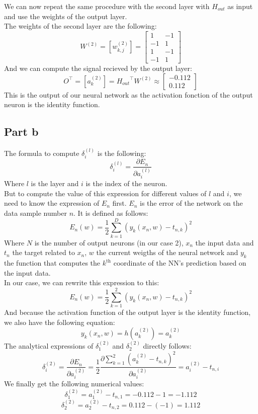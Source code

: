 \documentclass[a4paper, 10pt]{article}
\begin{document}
We can now repeat the same procedure with the second layer with $H_{out}$ as input and 
use the weights of the output layer.
\\
The weights of the second layer are the following:
$$
W^{(2)} = [w_{k,j}^{(2)}] = \begin{bmatrix}
    1 & -1\\
    -1 & 1\\
    1 & -1\\
    -1 & 1
\end{bmatrix}
$$
And we can compute the signal recieved by the output layer:
$$
O^\top = [a_k^{(2)}] = {H_{out}}^\top W^{(2)} \approx \begin{bmatrix}
    -0.112\\
    0.112
\end{bmatrix}
$$
This is the output of our neural network as the activation
fonction of the output neuron is the identity function.

\subsection{Part b}
The formula to compute $\delta_i^{(l)}$ is the following:
$$
\delta_i^{(l)} = \frac{\partial E_n}{\partial a_i^{(l)}}
$$
Where $l$ is the layer and $i$ is the index of the neuron.
\\
But to compute the value of this expression for different values of $l$ and $i$,
we need to know the expression of $E_n$ first. $E_n$ is the error of the network
on the data sample number $n$. It is defined as follows:
$$
E_n(w) = \frac{1}{2} \sum_{k=1}^D ( y_k(x_n,w)-t_{n,k})^2
$$
Where $N$ is the number of output neurons (in our case 2), $x_n$ the input data and 
$t_n$ the target related to $x_n$, $w$ the current weigths of the neural network and 
$y_k$ the function that computes the $k^\text{th}$ coordinate of the NN's prediction based on the input data.
\\
In our case, we can rewrite this expression to this:
$$
E_n(w) = \frac{1}{2} \sum_{k=1}^2( y_k(x_n, w)-t_{n,k})^2
$$
And because the activation function of the output layer is the identity function,
we also have the following equation:
$$
y_k(x_n,w) = h(a_k^{(2)}) = a_k^{(2)}
$$
The analytical expressions of $\delta_1^{(2)}$ and $\delta_2^{(2)}$ directly follows:
$$
\delta_i^{(2)} = \frac{\partial E_n}{\partial a_i^{(2)}} = \frac{1}{2}\frac{\partial  \sum_{k=1}^2( a_k^{(2)}-t_{n,k})^2}{\partial a_i^{(2)}} = a_i^{(2)} - t_{n,i}
$$
We finally get the following numerical values:
$$
\delta_1^{(2)} = a_1^{(2)} - t_{n,1} = -0.112 - 1 = -1.112
$$
$$
\delta_2^{(2)} = a_2^{(2)} - t_{n,2} = 0.112 - (-1) = 1.112
$$
\end{document}
